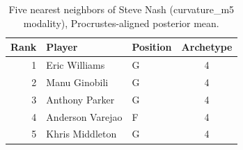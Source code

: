 \begin{table}[htbp]
  \centering\small
  \begin{tabular}{rllc}
    \toprule
    Rank & Player & Position & Archetype \\
    \midrule
    1 & Eric Williams & G & 4 \\
    2 & Manu Ginobili & G & 4 \\
    3 & Anthony Parker & G & 4 \\
    4 & Anderson Varejao & F & 4 \\
    5 & Khris Middleton & G & 4 \\
    \bottomrule
  \end{tabular}
  \caption{Five nearest neighbors of Steve Nash (curvature_m5 modality), Procrustes-aligned posterior mean.}
  \label{tab:Steve_Nash_neighbors_curvature_m5}
\end{table}

